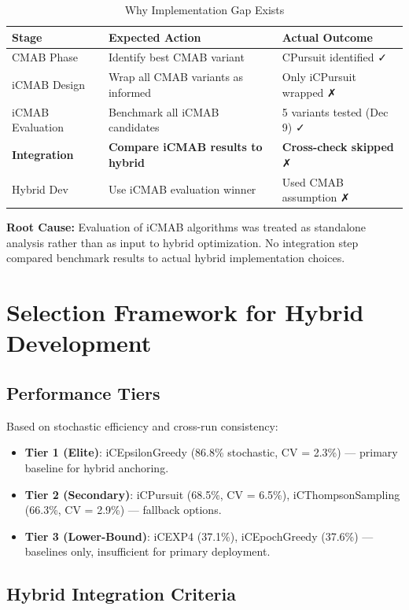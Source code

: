 \documentclass[12pt,a4paper]{article}
\newcommand{\warning}[1]{\textcolor{warningred}{\textbf{#1}}}
\begin{document}
\begin{table}[H]
\centering
\caption{Why Implementation Gap Exists}
\begin{tabular}{@{}lll@{}}
\toprule
\textbf{Stage} & \textbf{Expected Action} & \textbf{Actual Outcome} \\
\midrule
CMAB Phase & Identify best CMAB variant & CPursuit identified ✓ \\
iCMAB Design & Wrap all CMAB variants as informed & Only iCPursuit wrapped ✗ \\
iCMAB Evaluation & Benchmark all iCMAB candidates & 5 variants tested (Dec 9) ✓ \\
\warning{Integration} & \warning{Compare iCMAB results to hybrid} & \warning{Cross-check skipped} ✗ \\
Hybrid Dev & Use iCMAB evaluation winner & Used CMAB assumption ✗ \\
\bottomrule
\end{tabular}
\end{table}

\textbf{Root Cause:} Evaluation of iCMAB algorithms was treated as standalone analysis rather than as input to hybrid optimization. No integration step compared benchmark results to actual hybrid implementation choices.

\section{Selection Framework for Hybrid Development}

\subsection{Performance Tiers}

Based on stochastic efficiency and cross-run consistency:

\begin{itemize}
\item \textbf{Tier 1 (Elite)}: iCEpsilonGreedy (86.8\% stochastic, CV = 2.3\%) --- primary baseline for hybrid anchoring.
\item \textbf{Tier 2 (Secondary)}: iCPursuit (68.5\%, CV = 6.5\%), iCThompsonSampling (66.3\%, CV = 2.9\%) --- fallback options.
\item \textbf{Tier 3 (Lower-Bound)}: iCEXP4 (37.1\%), iCEpochGreedy (37.6\%) --- baselines only, insufficient for primary deployment.
\end{itemize}

\subsection{Hybrid Integration Criteria}
\end{document}
